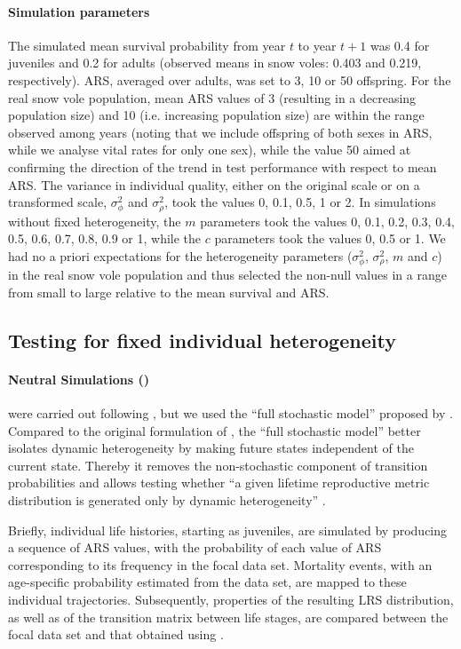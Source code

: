 \paragraph{Simulation parameters}
The simulated mean survival probability from  year $t$ to year $t+1$ was 0.4 for juveniles and 0.2 for adults (observed means in snow voles: 0.403 and 0.219, respectively). ARS, averaged over adults, was set to 3, 10 or 50 offspring. For the real snow vole population, mean ARS values of 3 (resulting in a decreasing population size) and 10 (i.e. increasing population size) are within the range observed among years (noting that we include offspring of both sexes in ARS, while we analyse vital rates for only one sex), while the value 50 aimed at confirming the direction of the trend in test performance with respect to mean ARS. The variance in individual quality, either on the original scale or on a transformed scale, $\sigma_{\phi}^2$ and $\sigma_{\rho}^2$, took the values 0, 0.1, 0.5, 1 or 2. In simulations without fixed heterogeneity, the $m$ parameters took the values 0, 0.1, 0.2, 0.3, 0.4, 0.5, 0.6, 0.7, 0.8, 0.9 or 1, while the $c$ parameters took the values 0, 0.5 or 1. We had no a priori expectations for the heterogeneity parameters ($\sigma_{\phi}^2$, $\sigma_{\rho}^2$, $m$ and $c$) in the real snow vole population and thus selected the non-null values in a range from small to large relative to the mean survival and ARS.


\subsection{Testing for fixed individual heterogeneity}
\paragraph{Neutral Simulations (\NSM)}
\NSM were carried out following \cite{Tuljapurkar2009}, but we used the ``full stochastic model'' proposed by \cite{Plard2012}. Compared to the original formulation of \NSM, the ``full stochastic model'' better isolates dynamic heterogeneity by making future states independent of the current state. Thereby it removes the non-stochastic component of transition probabilities and allows testing whether ``a given lifetime reproductive metric distribution is generated only by dynamic heterogeneity'' \parencite{Plard2012}. 

Briefly, individual life histories, starting as juveniles, are simulated by producing a sequence of ARS values, with the probability of each value of ARS corresponding to its frequency in the focal data set. Mortality events, with an age-specific probability estimated from the data set, are mapped to these individual trajectories. Subsequently, properties of the resulting LRS distribution, as well as of the transition matrix between life stages, are compared between the focal data set and that obtained using \NSM.

